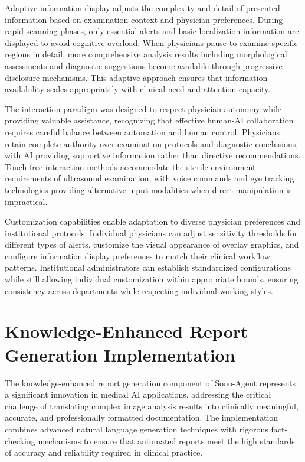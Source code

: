 Adaptive information display adjusts the complexity and detail of presented information based on examination context and physician preferences. During rapid scanning phases, only essential alerts and basic localization information are displayed to avoid cognitive overload. When physicians pause to examine specific regions in detail, more comprehensive analysis results including morphological assessments and diagnostic suggestions become available through progressive disclosure mechanisms. This adaptive approach ensures that information availability scales appropriately with clinical need and attention capacity.

The interaction paradigm was designed to respect physician autonomy while providing valuable assistance, recognizing that effective human-AI collaboration requires careful balance between automation and human control. Physicians retain complete authority over examination protocols and diagnostic conclusions, with AI providing supportive information rather than directive recommendations. Touch-free interaction methods accommodate the sterile environment requirements of ultrasound examination, with voice commands and eye tracking technologies providing alternative input modalities when direct manipulation is impractical.

Customization capabilities enable adaptation to diverse physician preferences and institutional protocols. Individual physicians can adjust sensitivity thresholds for different types of alerts, customize the visual appearance of overlay graphics, and configure information display preferences to match their clinical workflow patterns. Institutional administrators can establish standardized configurations while still allowing individual customization within appropriate bounds, ensuring consistency across departments while respecting individual working styles.

\section{Knowledge-Enhanced Report Generation Implementation}

The knowledge-enhanced report generation component of Sono-Agent represents a significant innovation in medical AI applications, addressing the critical challenge of translating complex image analysis results into clinically meaningful, accurate, and professionally formatted documentation. The implementation combines advanced natural language generation techniques with rigorous fact-checking mechanisms to ensure that automated reports meet the high standards of accuracy and reliability required in clinical practice.

